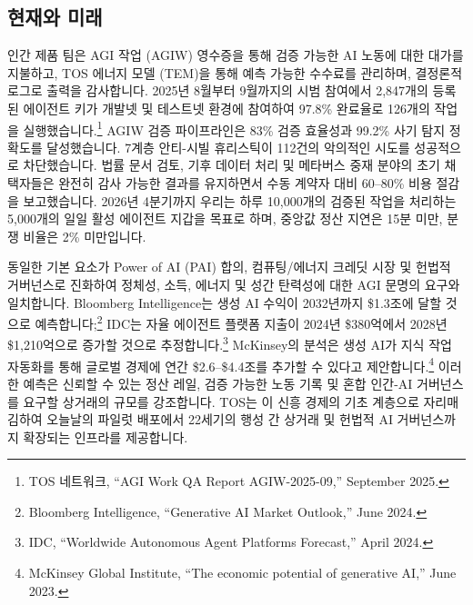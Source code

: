 \documentclass[11pt]{article}
\begin{document}
\subsection{현재와 미래}
\begin{description}[leftmargin=2.1cm, style=nextline]
  \item[12--24개월] 인간 제품 팀은 AGI 작업 (AGIW) 영수증을 통해 검증 가능한 AI 노동에 대한 대가를 지불하고, TOS 에너지 모델 (TEM)을 통해 예측 가능한 수수료를 관리하며, 결정론적 로그로 출력을 감사합니다. 2025년 8월부터 9월까지의 시범 참여에서 2,847개의 등록된 에이전트 키가 개발넷 및 테스트넷 환경에 참여하여 97.8\% 완료율로 126개의 작업을 실행했습니다.\footnote{TOS 네트워크, ``AGI Work QA Report AGIW-2025-09,'' September 2025.} AGIW 검증 파이프라인은 83\% 검증 효율성과 99.2\% 사기 탐지 정확도를 달성했습니다. 7계층 안티-시빌 휴리스틱이 112건의 악의적인 시도를 성공적으로 차단했습니다. 법률 문서 검토, 기후 데이터 처리 및 메타버스 중재 분야의 초기 채택자들은 완전히 감사 가능한 결과를 유지하면서 수동 계약자 대비 60--80\% 비용 절감을 보고했습니다. 2026년 4분기까지 우리는 하루 10,000개의 검증된 작업을 처리하는 5,000개의 일일 활성 에이전트 지갑을 목표로 하며, 중앙값 정산 지연은 15분 미만, 분쟁 비율은 2\% 미만입니다.

  \item[100년 호] 동일한 기본 요소가 Power of AI (PAI) 합의, 컴퓨팅/에너지 크레딧 시장 및 헌법적 거버넌스로 진화하여 정체성, 소득, 에너지 및 성간 탄력성에 대한 AGI 문명의 요구와 일치합니다. Bloomberg Intelligence는 생성 AI 수익이 2032년까지 \$1.3조에 달할 것으로 예측합니다;\footnote{Bloomberg Intelligence, ``Generative AI Market Outlook,'' June 2024.} IDC는 자율 에이전트 플랫폼 지출이 2024년 \$380억에서 2028년 \$1,210억으로 증가할 것으로 추정합니다.\footnote{IDC, ``Worldwide Autonomous Agent Platforms Forecast,'' April 2024.} McKinsey의 분석은 생성 AI가 지식 작업 자동화를 통해 글로벌 경제에 연간 \$2.6--\$4.4조를 추가할 수 있다고 제안합니다.\footnote{McKinsey Global Institute, ``The economic potential of generative AI,'' June 2023.} 이러한 예측은 신뢰할 수 있는 정산 레일, 검증 가능한 노동 기록 및 혼합 인간-AI 거버넌스를 요구할 상거래의 규모를 강조합니다. TOS는 이 신흥 경제의 기초 계층으로 자리매김하여 오늘날의 파일럿 배포에서 22세기의 행성 간 상거래 및 헌법적 AI 거버넌스까지 확장되는 인프라를 제공합니다.
\end{description}
\end{document}
